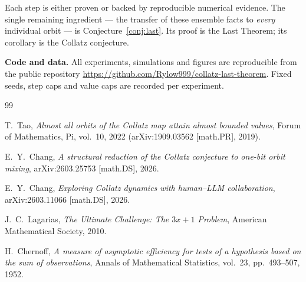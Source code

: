 \documentclass[12pt,reqno]{amsart}
\theoremstyle{plain}
\theoremstyle{definition}
\begin{document}
Each step is either proven or backed by reproducible numerical evidence. The
single remaining ingredient --- the transfer of these ensemble facts to
\emph{every} individual orbit --- is Conjecture~\ref{conj:last}. Its proof is
the Last Theorem; its corollary is the Collatz conjecture.

\textbf{Code and data.} All experiments, simulations and figures are
reproducible from the public repository
\url{https://github.com/Rylow999/collatz-last-theorem}. Fixed seeds, step caps
and value caps are recorded per experiment.

\begin{thebibliography}{99}

T.~Tao, \textit{Almost all orbits of the Collatz map attain almost bounded values},
Forum of Mathematics, Pi, vol.~10, 2022 (arXiv:1909.03562 [math.PR], 2019).

E.~Y.~Chang, \textit{A structural reduction of the Collatz conjecture to one-bit
orbit mixing}, arXiv:2603.25753 [math.DS], 2026.

E.~Y.~Chang, \textit{Exploring Collatz dynamics with human--LLM collaboration},
arXiv:2603.11066 [math.DS], 2026.

J.~C.~Lagarias, \textit{The Ultimate Challenge: The $3x+1$ Problem},
American Mathematical Society, 2010.

H.~Chernoff, \textit{A measure of asymptotic efficiency for tests of a
hypothesis based on the sum of observations}, Annals of Mathematical
Statistics, vol.~23, pp.~493--507, 1952.

\end{thebibliography}
\end{document}
